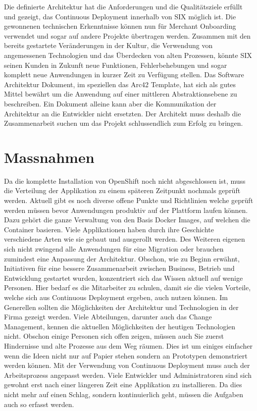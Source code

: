 Die definierte Architektur hat die Anforderungen und die Qualitätsziele erfüllt und gezeigt, das Continuous Deployment innerhalb von SIX möglich ist. Die gewonnenen technischen Erkenntnisse können nun für Merchant Onboarding verwendet und sogar auf andere Projekte übertragen werden. Zusammen mit den bereits gestartete Veränderungen in der Kultur, die Verwendung von angemessenen Technologien und das Überdecken von alten Prozessen, könnte SIX seinen Kunden in Zukunft neue Funktionen, Fehlerbehebungen und sogar komplett neue Anwendungen in kurzer Zeit zu Verfügung stellen.\newline
Das Software Architektur Dokument, im speziellen das Arc42 Template, hat sich als gutes Mittel bewährt um die Anwendung auf einer mittleren Abstraktionsebene zu beschreiben. Ein Dokument alleine kann aber die Kommunikation der Architektur an die Entwickler nicht ersetzten. Der Architekt muss deshalb die Zusammenarbeit suchen um das Projekt schlussendlich zum Erfolg zu bringen.

\chapter{Massnahmen}
Da die komplette Installation von OpenShift noch nicht abgeschlossen ist, muss die Verteilung der Applikation zu einem späteren Zeitpunkt nochmals geprüft werden. Aktuell gibt es noch diverse offene Punkte und Richtlinien welche geprüft werden müssen bevor Anwendungen produktiv auf der Plattform laufen können. Dazu gehört die ganze Verwaltung von den Basis Docker Images, auf welchen die Container basieren. Viele Applikationen haben durch ihre Geschichte verschiedene Arten wie sie gebaut und ausgerollt werden. Des Weiteren eigenen sich nicht zwingend alle Anwendungen für eine Migration oder brauchen zumindest eine Anpassung der Architektur. Obschon, wie zu Beginn erwähnt, Initiativen für eine bessere Zusammenarbeit zwischen Business, Betrieb und Entwicklung gestartet wurden, konzentriert sich das Wissen aktuell auf wenige Personen. Hier bedarf es die Mitarbeiter zu schulen, damit sie die vielen Vorteile, welche sich aus Continuous Deployment ergeben, auch nutzen können.\newline
Im Generellen sollten die Möglichkeiten der Architektur und Technologien in der Firma gezeigt werden. Viele Abteilungen, darunter auch das Change Management, kennen die aktuellen Möglichkeiten der heutigen Technologien nicht. Obschon einige Personen sich offen zeigen, müssen auch Sie zuerst Hindernisse und alte Prozesse aus dem Weg räumen. Dies ist um einiges einfacher wenn die Ideen nicht nur auf Papier stehen sondern an Prototypen demonstriert werden können.\newline
Mit der Verwendung von Continuous Deployment muss auch der Arbeitsprozess angepasst werden. Viele Entwickler und Administratoren sind sich gewohnt erst nach einer längeren Zeit eine Applikation zu installieren. Da dies nicht mehr auf einen Schlag, sondern kontinuierlich geht, müssen die Aufgaben auch so erfasst werden.